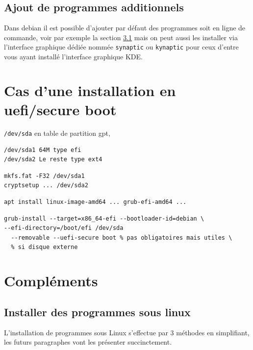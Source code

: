 \documentclass[12pt, a4paper]{report}
\begin{document}
\section{Ajout de programmes additionnels}
Dans debian il est possible d'ajouter par défaut des programmes soit en ligne de commande, voir par exemple la section \ref{subsec-install-progs-linux} mais on peut aussi les installer via l'interface graphique dédiée nommée \texttt{synaptic} ou \texttt{kynaptic} pour ceux d'entre vous ayant installé l'interface graphique KDE.

\chapter{Cas d'une installation en uefi/secure boot} \label{sec-uefi-machine}

\texttt{/dev/sda} en table de partition gpt,
\begin{verbatim}
/dev/sda1 64M type efi
/dev/sda2 Le reste type ext4
\end{verbatim}

\begin{verbatim}
mkfs.fat -F32 /dev/sda1
cryptsetup ... /dev/sda2
\end{verbatim}

\begin{verbatim}
apt install linux-image-amd64 ... grub-efi-amd64 ...
\end{verbatim}

\begin{verbatim}
grub-install --target=x86_64-efi --bootloader-id=debian \ 
--efi-directory=/boot/efi /dev/sda
  --removable --uefi-secure boot % pas obligatoires mais utiles \
  % si disque externe
\end{verbatim}

\chapter{Compléments}
\section{Installer des programmes sous linux} \label{subsec-install-progs-linux}
L'installation de programmes sous Linux s'effectue par 3 méthodes en simplifiant, les futurs paragraphes vont les présenter succinctement.
\end{document}
